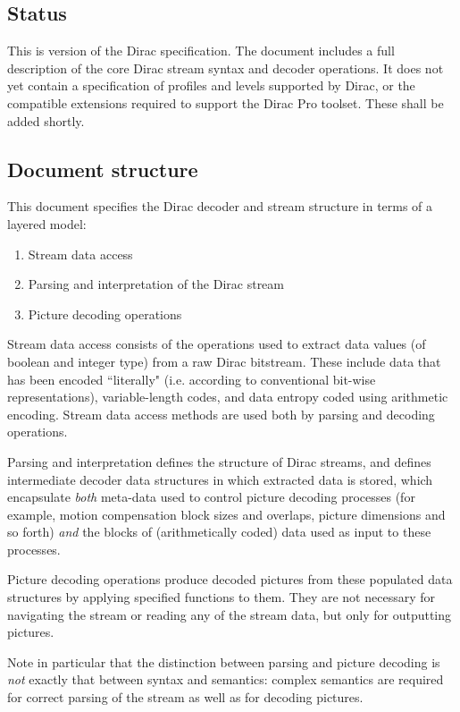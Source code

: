 \subsection{Status}
\label{introstatus}

This is version \SpecVersion of the Dirac specification. The document includes
a full description of the core Dirac stream syntax and decoder operations. It does
not yet contain a specification of profiles and levels supported by Dirac, or the
compatible extensions required to support the Dirac Pro toolset. These shall
be added shortly. 

\subsection{Document structure}
\label{introdocstruct}

This document specifies the Dirac decoder and stream structure in terms of
a layered model:

\begin{enumerate}
    \item Stream data access
    \item Parsing and interpretation of the Dirac stream
    \item Picture decoding operations
\end{enumerate}

Stream data access consists of the operations used to extract data values
(of boolean and integer type) from a raw Dirac bitstream. These include
data that has been encoded ``literally" (i.e. according to conventional bit-wise
representations), variable-length codes, and data entropy coded using arithmetic
encoding. Stream data access methods are used both by parsing and decoding operations.

Parsing and interpretation defines the structure of Dirac streams, and defines
intermediate decoder data structures in which extracted data is stored, which 
encapsulate {\em both} meta-data used to control picture decoding processes (for 
example, motion compensation block sizes and overlaps, picture dimensions and
so forth) {\em and} the blocks of (arithmetically coded) data used as input to 
these processes.

Picture decoding operations produce decoded pictures from these populated
data structures by applying specified functions to them. They are not necessary
for navigating the stream or reading any of the stream data, but only
for outputting pictures.

Note in particular that the distinction between parsing and picture decoding is
{\em not} exactly that between syntax and semantics: complex semantics are
required for correct parsing of the stream as well as for decoding pictures. 

